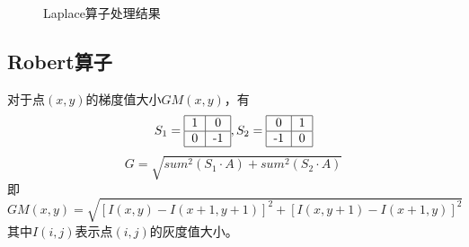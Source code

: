 \documentclass[UTF8]{ctexart}
\begin{document}
\begin{figure}[htbp]
\centering
{}
\caption{Laplace算子处理结果}
\end{figure}

\subsection{Robert算子}
对于点$(x,y)$的梯度值大小$GM(x,y)$，有
\[
S_1 = 
\begin{tabular}{|c|c|}
\hline
1 & 0 \\
\hline
0 & -1 \\
\hline
\end{tabular},
S_2 = 
\begin{tabular}{|c|c|}
\hline
0 & 1 \\
\hline
-1 & 0 \\
\hline
\end{tabular}
\]
\[
G = \sqrt{sum^2(S_1 \cdot A) + sum^2(S_2 \cdot A)}
\]
即
\[
	GM(x,y) = \sqrt{[I(x,y)-I(x+1,y+1)]^2+[I(x,y+1)-I(x+1,y)]^2}
\]
其中$I(i,j)$表示点$(i,j)$的灰度值大小。\\
\end{document}
